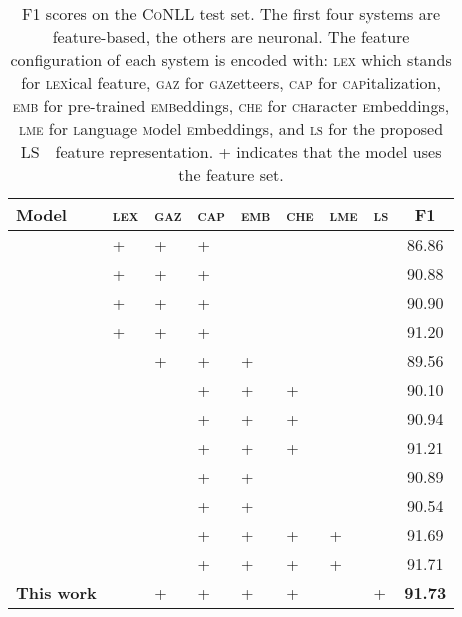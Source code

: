 \documentclass[11pt]{article}
\newcommand{\conll}{\textsc{CoNLL}}
\newcommand{\lr}{\textsc{LS}}
\newcommand{\lll}{\textsc{lex}}
\newcommand{\ggg}{\textsc{gaz}}
\newcommand{\ccc}{\textsc{cap}}
\newcommand{\chhh}{\textsc{che}}
\newcommand{\eee}{\textsc{emb}}
\newcommand{\mmm}{\textsc{lme}}
\newcommand{\sss}{\textsc{ls}}
\begin{document}
	\begin{table}[!h]
		\begin{center}
\setlength{\tabcolsep}{1mm}  
			\begin{tabular}{|l|lllllll|c|}
				\hline \textbf{Model} & \lll & \ggg & \ccc &\eee & \chhh & \mmm & \sss  & \textbf{F1} \\ 
				\hline
\cite{finkel2005incorporating} 		& \textsc{+}& \textsc{+}& \textsc{+} & &&& 	& 86.86 \\
				\cite{ratinov2009design} 			& \textsc{+}& \textsc{+}& \textsc{+} & &&&	& 90.88 \\
				\cite{lin2009phrase} 				& \textsc{+}& \textsc{+}& \textsc{+} & &&&	& 90.90\\
				\cite{luo-2015} &\textsc{+}& \textsc{+}& \textsc{+} & &&&	& 91.20 \\
				
				\hline
				\cite{collobert2011natural} 		&  & \textsc{+}& \textsc{+}& \textsc{+} &&&	& 89.56\\
				\cite{huang2015bidirectional} 		& & & \textsc{+}& \textsc{+}& \textsc{+} &  & 	& 90.10\\
				\cite{lample2016neural} 			& & & \textsc{+}& \textsc{+}& \textsc{+} &  & 	& 90.94 \\
				\cite{ma2016end} 				& & & \textsc{+}& \textsc{+}& \textsc{+} &  & 	& 91.21\\	 
				\cite{shen2017deep} 			& & & \textsc{+}& \textsc{+} &  &  & 	& 90.89 \\
\cite{strubell2017fast} 			& & & \textsc{+}& \textsc{+} &  &  & 	& 90.54 \\				
				\cite{tran2017named}  			& & & \textsc{+}& \textsc{+} & \textsc{+}& \textsc{+} &  	& 91.69 \\
				\cite{liu2017empower} 			& & & \textsc{+}& \textsc{+} & \textsc{+}& \textsc{+} &  	&  91.71 \\
				\hline					
				\textbf{This work} 				& & \textsc{+}& \textsc{+} & \textsc{+}& \textsc{+} &  	& \textsc{+}	& \bf 91.73 \\
				\hline
				
				
			\end{tabular}
\end{center}
		
		
		\caption{F1 scores on the \conll{} test set. The first four systems are feature-based, the others are neuronal. The   feature configuration of each system is encoded with:  \lll{} which stands for \textsc{lex}ical feature, \ggg{} for \textsc{gaz}etteers, \ccc{} for \textsc{cap}italization, \eee{} for pre-trained \textsc{emb}eddings, \chhh{} for \textsc{ch}aracter \textsc{e}mbeddings, \textsc{lme} for \textsc{l}anguage \textsc{m}odel \textsc{e}mbeddings, and  \sss{} for the proposed \lr{~} feature representation. \textsc{+} indicates that the model uses the feature set.}
		
		\label{tab:conll.res} 
		
	\end{table}
		
\end{document}
